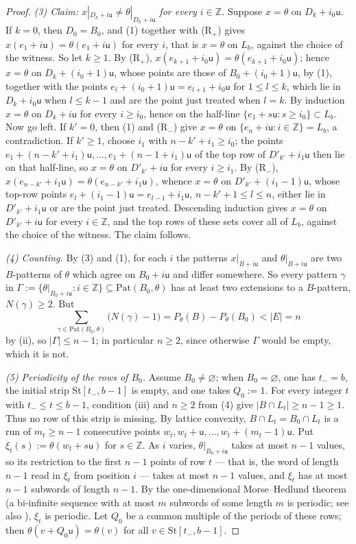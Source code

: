 \documentclass[11pt,reqno]{amsart}
\theoremstyle{plain}
\theoremstyle{definition}
\theoremstyle{remark}
\theoremstyle{plain}
\theoremstyle{remark}
\theoremstyle{definition}
\numberwithin{equation}{section}
\newcommand{\Z}{\mathbb{Z}}
\newcommand{\su}{\mathsf{u}}
\begin{document}
\begin{proof}
\emph{(3) Claim: $x|_{D_k+i\su}\ne\theta|_{D_k+i\su}$ for every $i\in\Z$.}
Suppose $x=\theta$ on $D_k+i_0\su$.  If $k=0$, then $D_0=B_0$, and (1) together
with \textup{(R$_+$)} gives $x(e_1+i\su)=\theta(e_1+i\su)$ for every $i$, that is
$x=\theta$ on $L_b$, against the choice of the witness.  So let $k\ge1$.  By
\textup{(R$_+$)}, $x(e_{k+1}+i_0\su)=\theta(e_{k+1}+i_0\su)$; hence $x=\theta$ on
$D_k+(i_0+1)\su$, whose points are those of $B_0+(i_0+1)\su$, by (1), together
with the points $e_l+(i_0+1)\su=e_{l+1}+i_0\su$ for $1\le l\le k$, which lie in
$D_k+i_0\su$ when $l\le k-1$ and are the point just treated when $l=k$.  By
induction $x=\theta$ on $D_k+i\su$ for every $i\ge i_0$, hence on the half-line
$\{e_1+s\su:s\ge i_0\}\subset L_b$.  Now go left.  If $k'=0$, then (1) and
\textup{(R$_-$)} give $x=\theta$ on $\{e_n+i\su:i\in\Z\}=L_b$, a contradiction.
If $k'\ge1$, choose $i_1$ with $n-k'+i_1\ge i_0$; the points
$e_1+(n-k'+i_1)\su,\dots,e_1+(n-1+i_1)\su$ of the top row of $D'_{k'}+i_1\su$
then lie on that half-line, so $x=\theta$ on $D'_{k'}+i\su$ for every $i\ge i_1$.
By \textup{(R$_-$)}, $x(e_{n-k'}+i_1\su)=\theta(e_{n-k'}+i_1\su)$, whence
$x=\theta$ on $D'_{k'}+(i_1-1)\su$, whose top-row points
$e_l+(i_1-1)\su=e_{l-1}+i_1\su$, $n-k'+1\le l\le n$, either lie in
$D'_{k'}+i_1\su$ or are the point just treated.  Descending induction gives
$x=\theta$ on $D'_{k'}+i\su$ for every $i\in\Z$, and the top rows of these sets
cover all of $L_b$, against the choice of the witness.  The claim follows.

\emph{(4) Counting.}  By (3) and (1), for each $i$ the patterns $x|_{B+i\su}$ and
$\theta|_{B+i\su}$ are two $B$-patterns of $\theta$ which agree on $B_0+i\su$
and differ somewhere.  So every pattern $\gamma$ in
$\Gamma:=\{\theta|_{B_0+i\su}:i\in\Z\}\subseteq\mathrm{Pat}(B_0,\theta)$ has at
least two extensions to a $B$-pattern, $N(\gamma)\ge2$.  But
\[\sum_{\gamma\in\mathrm{Pat}(B_0,\theta)}\bigl(N(\gamma)-1\bigr)
  =P_\theta(B)-P_\theta(B_0)<|E|=n\]
by (ii), so $|\Gamma|\le n-1$; in particular $n\ge2$, since otherwise $\Gamma$
would be empty, which it is not.

\emph{(5) Periodicity of the rows of $B_0$.}  Assume $B_0\ne\varnothing$; when
$B_0=\varnothing$, one has $t_-=b$, the initial strip
$\mathrm{St}[t_-,b-1]$ is empty, and one takes $Q_0:=1$.
For every integer $t$ with $t_-\le t\le b-1$, condition (iii) and $n\ge2$
from (4) give $|B\cap L_t|\ge n-1\ge1$.  Thus no row of this strip is missing.
By lattice convexity, $B\cap L_t=B_0\cap L_t$ is a run of $m_t\ge n-1$
consecutive points $w_t,w_t+\su,\dots,w_t+(m_t-1)\su$.  Put
$\xi_t(s):=\theta(w_t+s\su)$ for $s\in\Z$.  As $i$ varies, $\theta|_{B_0+i\su}$
takes at most $n-1$ values, so its restriction to the first $n-1$ points of row
$t$ — that is, the word of length $n-1$ read in $\xi_t$ from position $i$ — takes
at most $n-1$ values, and $\xi_t$ has at most $n-1$ subwords of length $n-1$.  By
the one-dimensional Morse--Hedlund theorem \cite{MH38} (a bi-infinite sequence
with at most $m$ subwords of some length $m$ is periodic; see also
\cite[Theorem~1.1]{Colle23a}), $\xi_t$ is periodic.  Let $Q_0$ be a common
multiple of the periods of these rows; then $\theta(v+Q_0\su)=\theta(v)$ for all
$v\in\mathrm{St}[t_-,b-1]$.


\end{proof}
\end{document}
